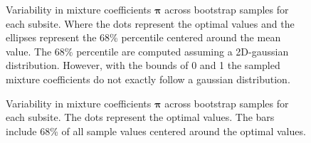 \documentclass[
  sn-mathphys-num,
]{sn-jnl}
\begin{document}
\begin{figure}


\caption{\label{fig-simplex_uncert}Variability in mixture coefficients
\(\boldsymbol{\pi}\) across bootstrap samples for each subsite. Where
the dots represent the optimal values and the ellipses represent the
68\% percentile centered around the mean value. The 68\% percentile are
computed assuming a 2D-gaussian distribution. However, with the bounds
of 0 and 1 the sampled mixture coefficients do not exactly follow a
gaussian distribution.}

\end{figure}%

\begin{figure}


\caption{\label{fig-3_comp_scatter_uncert}Variability in mixture
coefficients \(\boldsymbol{\pi}\) across bootstrap samples for each
subsite. The dots represent the optimal values. The bars include 68\% of
all sample values centered around the optimal values.}

\end{figure}%
\end{document}
